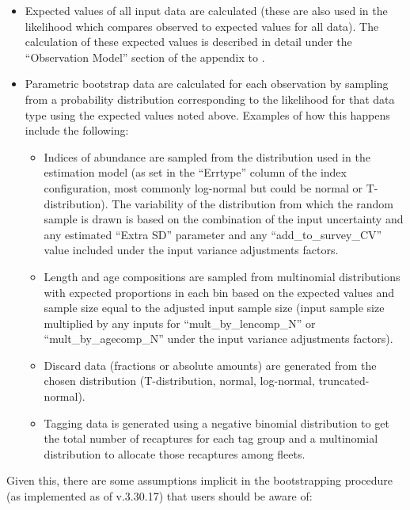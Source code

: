 \begin{itemize}
	\item Expected values of all input data are calculated (these are also used in the likelihood which compares observed to expected values for all data). The calculation of these expected values is described in detail under the ``Observation Model'' section of the appendix to \citet{methotstock2013}.
	
	\item Parametric bootstrap data are calculated for each observation by sampling from a probability distribution corresponding to the likelihood for that data type using the expected values noted above. Examples of how this happens include the following:
	
	\begin{itemize}
		\item Indices of abundance are sampled from the distribution used in the estimation model (as set in the ``Errtype'' column of the index configuration, most commonly log-normal but could be normal or T-distribution). The variability of the distribution from which the random sample is drawn is based on the combination of the input uncertainty and any estimated ``Extra SD'' parameter and any ``add\_to\_survey\_CV'' value included under the input variance adjustments factors.
		
		\item Length and age compositions are sampled from multinomial distributions with expected proportions in each bin based on the expected values and sample size equal to the adjusted input sample size (input sample size multiplied by any inputs for ``mult\_by\_lencomp\_N'' or ``mult\_by\_agecomp\_N'' under the input variance adjustments factors).
		
		\item Discard data (fractions or absolute amounts) are generated from the chosen distribution (T-distribution, normal, log-normal, truncated-normal).
		
		\item Tagging data is generated using a negative binomial distribution to get the total number of recaptures for each tag group and a multinomial distribution to allocate those recaptures among fleets.
	\end{itemize}
\end{itemize}

Given this, there are some assumptions implicit in the bootstrapping procedure (as implemented as of v.3.30.17) that users should be aware of:

